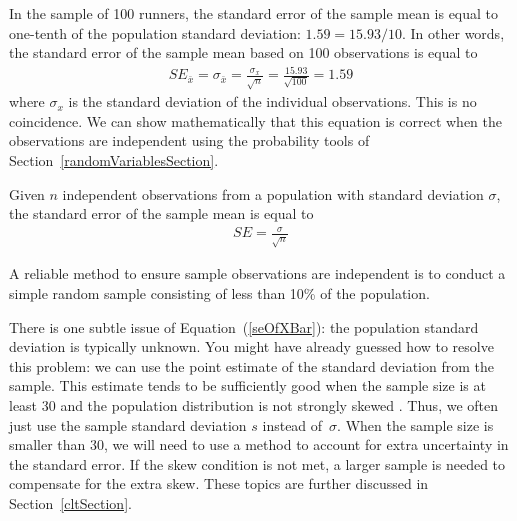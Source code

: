 In the sample of 100 runners, the standard error of the sample mean is equal to one-tenth of the population standard deviation: $1.59 = 15.93/10$. In other words, the standard error of the sample mean based on 100 observations is equal to
\begin{eqnarray*}
SE_{\bar{x}} = \sigma_{\bar{x}} = \frac{\sigma_{x}}{\sqrt{n}} = \frac{15.93}{\sqrt{100}} = 1.59
\end{eqnarray*}
where $\sigma_{x}$ is the standard deviation of the individual observations. This is no coincidence. We can show mathematically that this equation is correct when the observations are independent  using the probability tools of Section~\ref{randomVariablesSection}.

\begin{termBox}{
Given $n$ independent observations from a population with standard deviation $\sigma$, the standard error of the sample mean is equal to \vspace{-1mm}
\begin{eqnarray}
SE = \frac{\sigma}{\sqrt{n}}
\label{seOfXBar}
\end{eqnarray}\vspace{-3mm}%

A reliable method to ensure sample observations are independent is to conduct a simple random sample consisting of less than 10\% of the population.
}
\end{termBox}

There is one subtle issue of Equation~(\ref{seOfXBar}): the population standard deviation is typically unknown. You might have already guessed how to resolve this problem: we can use the point estimate of the standard deviation from the sample. This estimate tends to be sufficiently good when the sample size is at least 30 and the population distribution is not strongly skewed%
. Thus, we often just use the sample standard deviation $s$ instead of~$\sigma$. When the sample size is smaller than 30, we will need to use a method to account for extra uncertainty in the standard error. If the skew condition is not met, a larger sample is needed to compensate for the extra skew. These topics are further discussed in Section~\ref{cltSection}.

